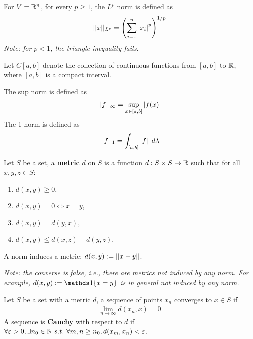 \documentclass[11pt]{article}
\begin{document}
	\begin{example}
		For $V = \mathbb{R}^n$, \ul{for every $p \geq 1$}, the $L^p$ norm is defined as
		\begin{align}
			\vert \vert {x} \vert \vert_{L^p} = \left( \sum_{i=1}^n \left \vert {x_i} \right \vert^p \right)^{1/p}
		\end{align}
		\emph{Note: for $p < 1$, the triangle inequality fails.}
	\end{example}
	
	\begin{example}
		Let $C[a, b]$ denote the collection of continuous functions from $[a, b]$ to $\mathbb{R}$, where $[a, b]$ is a compact interval.
		
		The sup norm is defined as
		\begin{align}
			\vert \vert {f} \vert \vert_\infty = \sup_{x \in [a, b]} \left \vert {f(x)} \right \vert
		\end{align}
		The 1-norm is defined as
		\begin{align}
			\vert \vert {f} \vert \vert_1 = \int_{[a, b]} \left \vert {f} \right \vert\ d\lambda
		\end{align}
	\end{example}
	
	\begin{definition}
		Let $S$ be a set, a \textbf{metric} $d$ on $S$ is a function $d: S \times S \to \mathbb{R}$ such that for all $x, y, z \in S$:
		\begin{enumerate}
			\item $d(x, y) \geq 0$,
			\item $d(x, y) = 0 \iff x = y$,
			\item $d(x, y) = d(y, x)$,
			\item $d(x, y) \leq d(x, z) + d(y, z)$.
		\end{enumerate}
	\end{definition}
	
	\begin{proposition}
		A norm induces a metric: $d(x, y) := \vert \vert {x - y} \vert \vert$.
		
		\emph{Note: the converse is false, i.e., there are metrics not induced by any norm. For example, $d(x, y) := \id{x = y}$ is in general not induced by any norm.}
	\end{proposition}
	
	\begin{definition}
		Let $S$ be a set with a metric $d$, a sequence of points $x_n$ converges to $x \in S$ if
		\begin{align}
			\lim_{n \to \infty} d(x_n, x) = 0
		\end{align}
		A sequence is \textbf{Cauchy} with respect to $d$ if $\forall \varepsilon > 0, \exists n_0 \in \mathbb{N}\ s.t.\ \forall m, n \geq n_0, d(x_m, x_n) < \varepsilon$.
	\end{definition}
	
\end{document}
